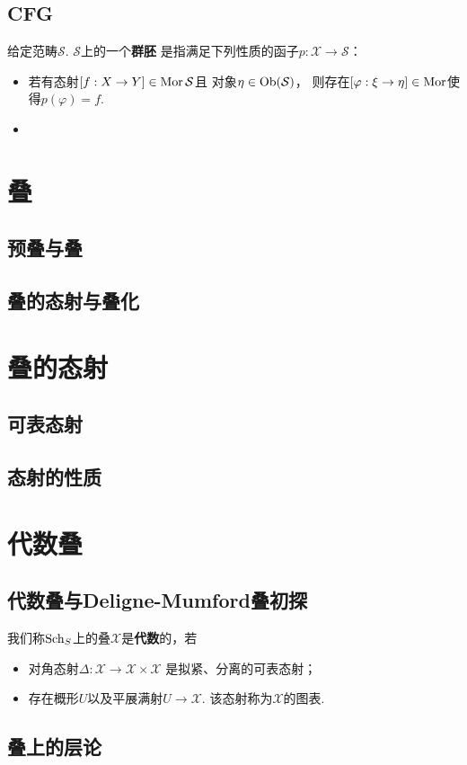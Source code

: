 \subsection{CFG}
\begin{definition}
    给定范畴$\mathcal{S}$. $\mathcal{S}$上的一个\textbf{群胚}
    是指满足下列性质的函子$p:\mathcal{X} \to \mathcal{S}$：
    \begin{itemize}
        \item[(1)] 若有态射$[f:X \to Y] \in \operatorname{Mor}{\mathcal{S}}$且
        对象$\eta \in \operatorname{Ob}(\mathcal{S})$，
        则存在$[\varphi:\xi \to \eta] \in \operatorname{Mor}$使得$p(\varphi) = f$.

        \item[(2)] 
    \end{itemize}
\end{definition}

\section{叠}
\subsection{预叠与叠}

\subsection{叠的态射与叠化}

\section{叠的态射}
\subsection{可表态射}

\subsection{态射的性质}

\section{代数叠}
\subsection{代数叠与Deligne-Mumford叠初探}
\begin{definition}
    我们称$\operatorname{Sch}_{S}$上的叠$\mathcal{X}$是\textbf{代数}的，若
    \begin{itemize}
        \item[(1)] 对角态射$\Delta:\mathcal{X} \to \mathcal{X} \times \mathcal{X}$
        是拟紧、分离的可表态射；
        \item[(2)] 存在概形$U$以及平展满射$U \to \mathcal{X}$. 
        该态射称为$\mathcal{X}$的图表.
    \end{itemize}
\end{definition}

\subsection{叠上的层论}